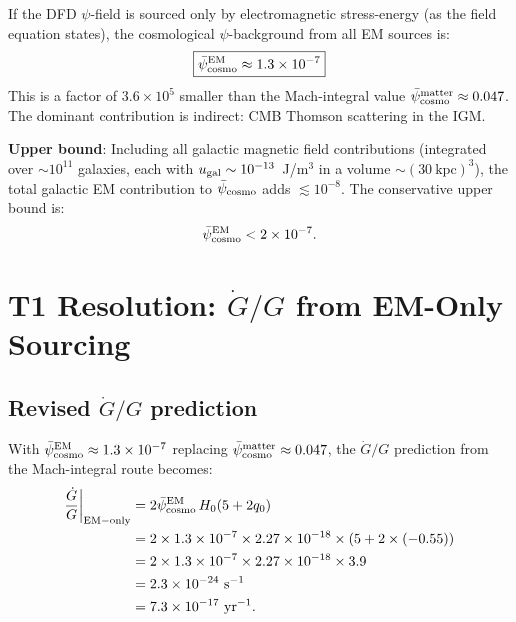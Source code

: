 \documentclass[11pt]{article}
\newcommand{\ee}[1]{\times 10^{#1}}
\newcommand{\Gdot}{\dot{G}/G}
\newcommand{\psicosmo}{\bar{\psi}_{\rm cosmo}}
\begin{document}
\begin{tcolorbox}[colback=green!5!white, colframe=green!60!black,
  title=\textbf{KEY RESULT: $\psicosmo^{\rm EM} \approx 1.3\ee{-7}$}]
If the DFD $\psi$-field is sourced only by electromagnetic stress-energy
(as the field equation states), the cosmological $\psi$-background from
all EM sources is:
\begin{equation}
\boxed{\psicosmo^{\rm EM} \approx 1.3\ee{-7}}
\end{equation}
This is a factor of $3.6\ee{5}$ smaller than the Mach-integral value
$\psicosmo^{\rm matter} \approx 0.047$. The dominant contribution is
indirect: CMB Thomson scattering in the IGM.

\textbf{Upper bound}: Including all galactic magnetic field contributions
(integrated over $\sim 10^{11}$ galaxies, each with $u_{\rm gal} \sim
10^{-13}$~J/m$^3$ in a volume $\sim (30~\text{kpc})^3$), the total
galactic EM contribution to $\psicosmo$ adds $\lesssim 10^{-8}$.
The conservative upper bound is:
\begin{equation}
\psicosmo^{\rm EM} < 2\ee{-7}.
\end{equation}
\end{tcolorbox}

\section{T1 Resolution: $\Gdot$ from EM-Only Sourcing}
\label{sec:T1-resolution}

\subsection{Revised $\Gdot$ prediction}

With $\psicosmo^{\rm EM} \approx 1.3\ee{-7}$ replacing $\psicosmo^{\rm matter}
\approx 0.047$, the $\Gdot$ prediction from the Mach-integral route becomes:
\begin{align}
\frac{\dot{G}}{G}\bigg|_{\rm EM-only}
&= 2\psicosmo^{\rm EM}\,H_0(5+2q_0) \nonumber\\
&= 2\times1.3\ee{-7}\times2.27\ee{-18}\times(5+2\times(-0.55))
\nonumber\\
&= 2\times1.3\ee{-7}\times2.27\ee{-18}\times3.9 \nonumber\\
&= 2.3\ee{-24}~\text{s}^{-1} \nonumber\\
&= 7.3\ee{-17}~\text{yr}^{-1}.
\label{eq:Gdot-EM}
\end{align}
\end{document}
